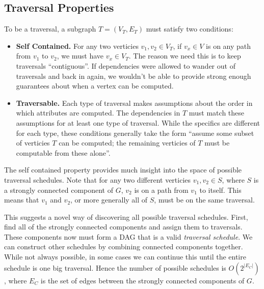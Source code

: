 \documentclass[10pt]{article}
\begin{document}
    \subsection{Traversal Properties}
    To be a traversal, a subgraph $T = (V_T, E_T)$ must satisfy two conditions:
    \begin{itemize}
        \item \textbf{Self Contained.} For any two verticies $v_1, v_2 \in V_T$, if $v_x \in V$ is on any path from $v_1$ to $v_2$, we must have $v_x \in V_T$. The reason we need this is to keep traversals ``contiguous''. If dependencies were allowed to wander out of traversals and back in again, we wouldn't be able to provide strong enough guarantees about when a vertex can be computed.
        \item \textbf{Traversable.} Each type of traversal makes assumptions about the order in which attributes are computed. The dependencies in $T$ must match these assumptions for at least one type of traversal. While the specifics are different for each type, these conditions generally take the form ``assume some subset of verticies $T$ can be computed; the remaining verticies of $T$ must be computable from these alone''.
    \end{itemize}

    The self contained property provides much insight into the space of possible traversal schedules. Note that for any two different verticies $v_1,v_2 \in S$, where $S$ is a strongly connected component of $G$, $v_2$ is on a path from $v_1$ to itself. This means that $v_1$ and $v_2$, or more generally all of $S$, must be on the same traversal. 
    
    This suggests a novel way of discovering all possible traversal schedules. First, find all of the strongly connected components and assign them to traversals. These components now must form a DAG that is a valid \emph{traversal schedule}. We can construct other schedules by combining connected components together. While not always possible, in some cases we can continue this until the entire schedule is one big traversal. Hence the number of possible schedules is
    $O(2^{|E_C|})$, where $E_C$ is the set of edges between the strongly connected components of $G$.
\end{document}
